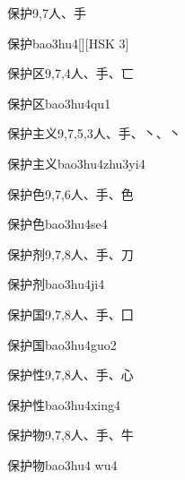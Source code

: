 \begin{entry}{保护}{9,7}{⼈、⼿}
  \begin{phonetics}{保护}{bao3hu4}[][HSK 3]
  \end{phonetics}
\end{entry}

\begin{entry}{保护区}{9,7,4}{⼈、⼿、⼖}
  \begin{phonetics}{保护区}{bao3hu4qu1}
  \end{phonetics}
\end{entry}

\begin{entry}{保护主义}{9,7,5,3}{⼈、⼿、⼂、⼂}
  \begin{phonetics}{保护主义}{bao3hu4zhu3yi4}
  \end{phonetics}
\end{entry}

\begin{entry}{保护色}{9,7,6}{⼈、⼿、⾊}
  \begin{phonetics}{保护色}{bao3hu4se4}
  \end{phonetics}
\end{entry}

\begin{entry}{保护剂}{9,7,8}{⼈、⼿、⼑}
  \begin{phonetics}{保护剂}{bao3hu4ji4}
  \end{phonetics}
\end{entry}

\begin{entry}{保护国}{9,7,8}{⼈、⼿、⼞}
  \begin{phonetics}{保护国}{bao3hu4guo2}
  \end{phonetics}
\end{entry}

\begin{entry}{保护性}{9,7,8}{⼈、⼿、⼼}
  \begin{phonetics}{保护性}{bao3hu4xing4}
  \end{phonetics}
\end{entry}

\begin{entry}{保护物}{9,7,8}{⼈、⼿、⽜}
  \begin{phonetics}{保护物}{bao3hu4 wu4}
  \end{phonetics}
\end{entry}

